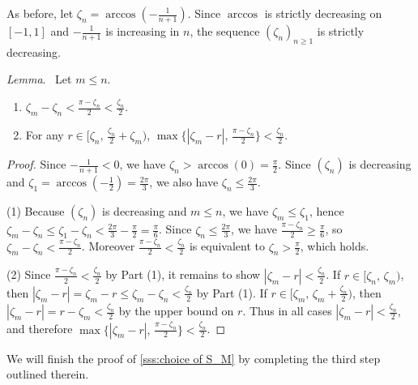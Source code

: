 \documentclass{amsart}
\makeatletter
\renewcommand\subsubsection{\@startsection{subsubsection}{3}
	\z@{.5\linespacing\@plus.7\linespacing}{0em}
	{\normalfont\itshape}}
\theoremstyle{definition}
\newcommand{\darkblue}{\color{darkblue}}
\renewcommand{\lemma}{\medskip\noindent\textit{\darkblue Lemma}.\ }
\theoremstyle{theorem}
\makeatother
\begin{document}
As before, let $\zeta_n = \arccos\!\left(-\tfrac{1}{n+1}\right)$.
Since $\arccos$ is strictly decreasing on $[-1,1]$ and $-\frac{1}{n+1}$ is increasing in $n$, the sequence $(\zeta_n)_{n\ge 1}$ is strictly decreasing.

\lemma
Let $m \leq n$.
\begin{enumerate}
	\item $\zeta_m - \zeta_n < \tfrac{\pi - \zeta_n}{2} < \tfrac{\zeta_n}{2}$.
	\item For any $r \in \big[\zeta_n,\, \tfrac{\zeta_n}{2}+\zeta_m\big)$, $\max\big\{|\zeta_m - r|,\, \tfrac{\pi - \zeta_n}{2}\big\} < \tfrac{\zeta_n}{2}$.
\end{enumerate}

\begin{proof}
	Since $-\frac{1}{n+1} < 0$, we have $\zeta_n > \arccos(0) = \tfrac{\pi}{2}$.
	Since $(\zeta_n)$ is decreasing and $\zeta_1 = \arccos\!\left(-\tfrac12\right) = \tfrac{2\pi}{3}$, we also have $\zeta_n \le \tfrac{2\pi}{3}$.

	\smallskip
	(1) Because $(\zeta_n)$ is decreasing and $m\le n$, we have $\zeta_m \le \zeta_1$, hence
	$\zeta_m - \zeta_n \le \zeta_1 - \zeta_n < \tfrac{2\pi}{3} - \tfrac{\pi}{2} = \tfrac{\pi}{6}$.
	Since $\zeta_n \le \tfrac{2\pi}{3}$, we have $\tfrac{\pi - \zeta_n}{2} \ge \tfrac{\pi}{6}$, so $\zeta_m - \zeta_n < \tfrac{\pi - \zeta_n}{2}$.
	Moreover $\tfrac{\pi - \zeta_n}{2} < \tfrac{\zeta_n}{2}$ is equivalent to $\zeta_n > \tfrac{\pi}{2}$, which holds.

	\smallskip
	(2) Since $\tfrac{\pi - \zeta_n}{2} < \tfrac{\zeta_n}{2}$ by Part (1), it remains to show $|\zeta_m - r| < \tfrac{\zeta_n}{2}$.
	If $r \in [\zeta_n,\, \zeta_m)$, then $|\zeta_m - r| = \zeta_m - r \le \zeta_m - \zeta_n < \tfrac{\zeta_n}{2}$ by Part (1).
	If $r \in [\zeta_m,\, \zeta_m + \tfrac{\zeta_n}{2})$, then $|\zeta_m - r| = r - \zeta_m < \tfrac{\zeta_n}{2}$ by the upper bound on $r$.
	Thus in all cases $|\zeta_m - r| < \tfrac{\zeta_n}{2}$, and therefore $\max\big\{|\zeta_m - r|,\, \tfrac{\pi - \zeta_n}{2}\big\} < \tfrac{\zeta_n}{2}$.
\end{proof}

\subsubsection{}\label{sss:comparison_lemma_zeta_n}

We will finish the proof of \cref{sss:choice of S_M} by completing the third step outlined therein.
\end{document}
